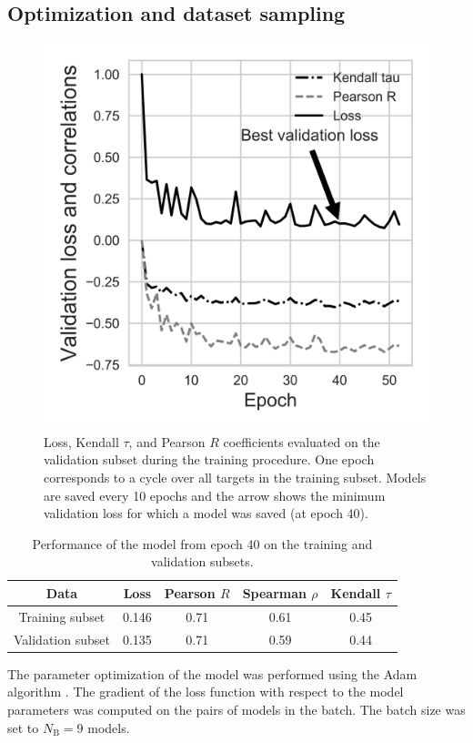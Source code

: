 \documentclass{bioinfo}
\begin{document}
\subsection{Optimization and dataset sampling}
%
%
\begin{figure}[!tpb]
    \centering
    \includegraphics[width=\linewidth]{image4}
    \caption{Loss, Kendall $\tau$, and Pearson $R$ coefficients
      evaluated on the validation subset during the training
      procedure.  One epoch corresponds to a cycle over all targets in
      the training subset. Models are saved every 10 epochs and the
      arrow shows the minimum validation loss for which a model was
      saved (at epoch 40).}
    \label{Fig:TrainingLoss}
\end{figure}
\begin{table}[!t]
  \caption {Performance of the model from epoch 40 on the training and
    validation subsets.}
\begin{tabular}{ c | c | c | c | c }
    Data & Loss & Pearson $R$ & Spearman $\rho$ & Kendall $\tau$ \\
    \hline
    Training subset     &0.146 &0.71 &0.61 &0.45 \\
    Validation subset   &0.135 &0.71 &0.59 &0.44 \\ \hline
\end{tabular}
\label{Tbl:TrainingResults}
\end{table}
The parameter optimization of the model was performed using the Adam
algorithm \citep{kingma2014adam}. The gradient of the loss function
with respect to the model parameters was computed on the pairs of
models in the batch. The batch size was set to $N_\text{B} = 9$
models.
\end{document}
